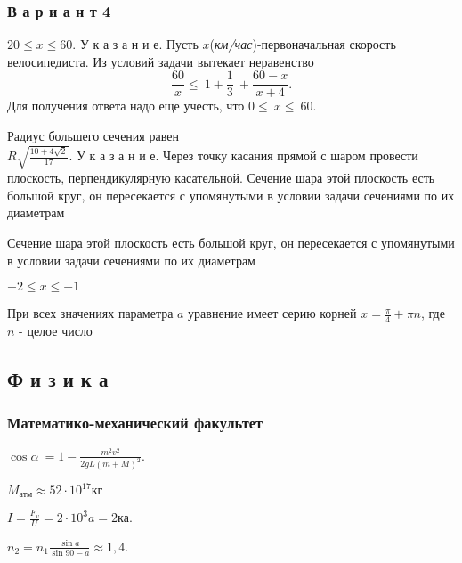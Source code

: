 \subsubsection*{В а р и а н т 4}

\begin{enums}
	\item $20\leqslant x\leq 60$. У к а з а н и е. Пусть $x$(\textit{км/час})-первоначальная скорость велосипедиста. Из условий задачи вытекает неравенство
	\begin{equation*}
		\frac{60}{x} \leqslant\ 1 + \frac{1}{3}\ + \frac{60 - x}{x + 4}.
	\end{equation*}
	Для получения ответа надо еще учесть, что $0\leq\  x\leq\  60$.
	
	\item Радиус большего сечения равен\\
	\begin{math}
		R\sqrt{\frac{10 + 4\sqrt{2}}{17}}.
	\end{math}
	У к а з а н и е. Через точку касания прямой с шаром провести плоскость, перпендикулярную касательной.
	Сечение шара этой плоскость есть большой круг, он пересекается с упомянутыми в условии задачи сечениями по их диаметрам
	\newpage
	
	Сечение шара этой плоскость есть большой круг, он пересекается с упомянутыми в условии задачи сечениями по их диаметрам
	\item $-2\leq x\leqslant-1$
	
	\item При всех значениях параметра $ \mathit{a} $ уравнение имеет серию корней $x=\frac{\pi}{4} + \pi n$, где $ \mathit{n} $ - целое число
\end{enums}
\subsection*{Ф и з и к а}
\subsubsection*{Математико-механический факультет}
\begin{enums}
	\item \begin{math}
		\cos{\alpha}\ = 1 - \frac{m^2v^2}{2gL(m+M)^2}.
	\end{math}
	
	\item $M_\text{атм}\approx 52\cdot 10^{17} \textit{кг}$
	
	\item \begin{math}
		I = \frac{F_v}{U} = 2\cdot 10^3a=2\textit{ка}.
	\end{math}
	
	\item \begin{math}
		n_2 = n_1 \frac{\sin{a}}{\sin{90-a}}\approx1,4.
	\end{math}
\end{enums}

